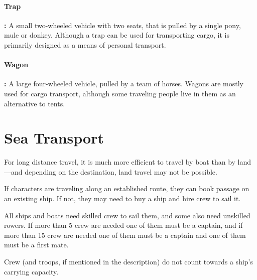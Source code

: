 \begin{multicols*}{2}
\paragraph{Trap}\textbf{:} A small two-wheeled vehicle with two seats, that is pulled by a single pony, mule or donkey. Although a trap can be used for transporting cargo, it is primarily designed as a means of personal transport.

\paragraph{Wagon}\textbf{:} A large four-wheeled vehicle, pulled by a team of horses. Wagons are mostly used for cargo transport, although some traveling people live in them as an alternative to tents.

\section{Sea Transport}
For long distance travel, it is much more efficient to travel by boat than by land—and depending on the destination, land travel may not be possible.

If characters are traveling along an established route, they can book passage on an existing ship. If not, they may need to buy a ship and hire crew to sail it.

All ships and boats need skilled crew to sail them, and some also need unskilled rowers. If more than 5 crew are needed one of them must be a captain, and if more than 15 crew are needed one of them must be a captain and one of them must be a first mate.

Crew (and troops, if mentioned in the description) do not count towards a ship’s carrying capacity.

\end{multicols*}
